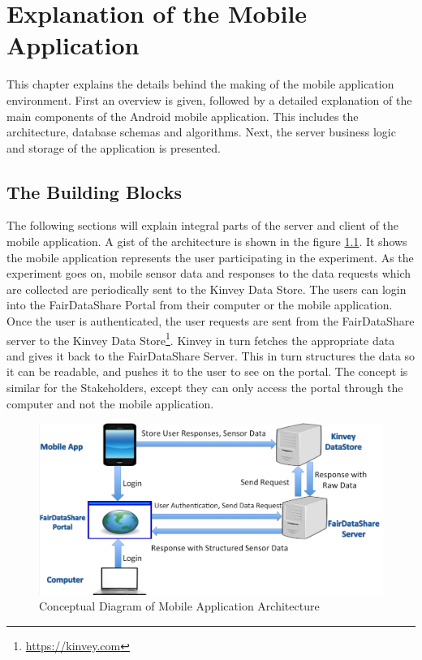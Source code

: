 \chapter{Explanation of the Mobile Application}
This chapter explains the details behind the making of the mobile application environment. First an overview is given, followed by a detailed explanation of the main components of the Android mobile application. This includes the architecture, database schemas and algorithms. Next, the server business logic and storage of the application is presented.

\section{The Building Blocks}

The following sections will explain integral parts of the server and client of the mobile application. A gist of the architecture is shown
in the figure \ref{fig:bb}. It shows the mobile application represents the user participating in the experiment. As the experiment goes on,
mobile sensor data and responses to the data requests which are collected are periodically sent to the Kinvey Data Store. 
The users can login into the FairDataShare Portal from their computer or the mobile application. Once the user is authenticated, the user requests
are sent from the FairDataShare server to the Kinvey Data Store\footnote{\url{https://kinvey.com}}. Kinvey in turn fetches the appropriate data and gives it back to the FairDataShare Server. This in turn structures the data so it can be readable, and pushes it to the user to see on the portal. The concept is similar for the Stakeholders, except they can only access the portal through the computer and not the mobile application.

\begin{figure}[ht!]
\centering
\includegraphics[width=\textwidth,keepaspectratio]{./images/blocks_app}
\caption{Conceptual Diagram of Mobile Application Architecture}
\label{fig:bb}
\end{figure}

